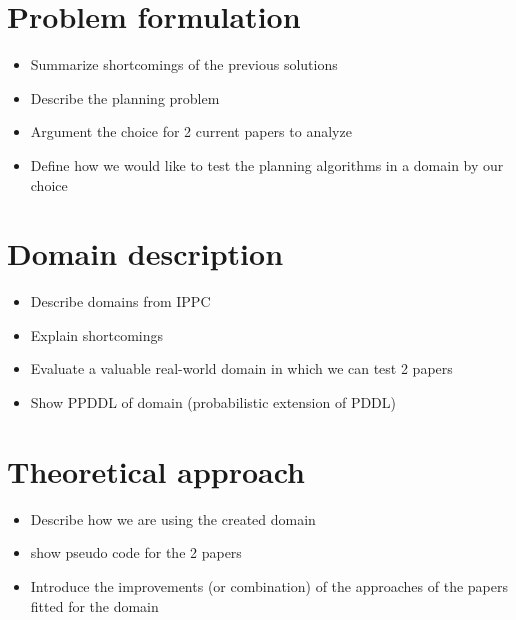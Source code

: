 \documentclass[runningheads,a4paper]{llncs}
\begin{document}

\section{Problem formulation}

\begin{itemize}
	\item Summarize shortcomings of the previous solutions
	\item Describe the planning problem
	\item Argument the choice for 2 current papers to analyze
	\item Define how we would like to test the planning algorithms in a domain by our choice
\end{itemize}


\section{Domain description}

\begin{itemize}
	\item Describe domains from IPPC
	\item Explain shortcomings
	\item Evaluate a valuable real-world domain in which we can test 2 papers
	\item Show PPDDL of domain (probabilistic extension of PDDL)
\end{itemize}


\section{Theoretical approach}

\begin{itemize}
	\item Describe how we are using the created domain
	\item show pseudo code for the 2 papers
	\item Introduce the improvements (or combination) of the approaches of the papers fitted for the domain
\end{itemize}

\end{document}
